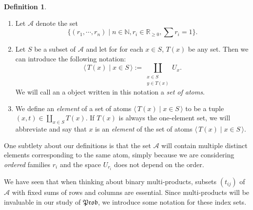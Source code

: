\documentclass[a4paper]{amsproc}
\theoremstyle{plain}
\theoremstyle{definition}
\newtheorem{definition}[theorem]{Definition}
\theoremstyle{remark}
\numberwithin{equation}{section}
\newcommand{\Prob}{\mathfrak{Prob}}
\newcommand{\la}{\langle\,}
\newcommand{\ra}{\,\rangle}
\begin{document}
\begin{definition}
    \begin{enumerate}

        \item Let $\mathcal{A}$ denote the set
        \[
            \{(r_1,\cdots, r_n) \mid n \in \mathbb{N}, r_i \in \mathbb{R}_{\geq 0}, \sum r_i = 1\}.
        \]
        \item Let $S$ be a subset of $\mathcal{A}$ and let for for each $x \in S$, $T(x)$ be any set. Then we can introduce the following notation:
        \[
            \la T(x) \mid x \in S \ra := \coprod_{\substack{x \in S \\ y \in T(x)}} U_x .
        \]
        We will call an a object written in this notation a \emph{set of atoms}.
        \item We define an \emph{element} of a set of atoms $\la T(x) \mid x \in S \ra$ to be a tuple $(x,t) \in \coprod_{x \in S} T(x)$. If $T(x)$ is always the one-element set, we will abbreviate and say that $x$ is an \emph{element} of the set of atoms $\la T(x) \mid x \in S \ra$.
    \end{enumerate}
\end{definition}

One subtlety about our definitions is that the set $\mathcal{A}$ will contain multiple distinct elements corresponding to the same atom, simply because we are considering \emph{ordered} families $r_i$ and the space $U_{r_i}$ does not depend on the order.

We have seen that when thinking about binary multi-products, subsets $(t_{ij})$ of $\mathcal{A}$ with fixed sums of rows and columns are essential. Since multi-products will be invaluable in our study of $\Prob$, we introduce some notation for these index sets.
\end{document}
